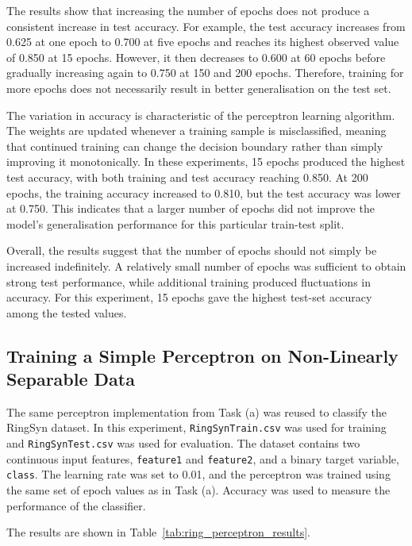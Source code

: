 \documentclass[a4paper,12pt]{article}
\begin{document}
The results show that increasing the number of epochs does not produce a consistent increase in test accuracy. For example, the test accuracy increases from 0.625 at one epoch to 0.700 at five epochs and reaches its highest observed value of 0.850 at 15 epochs. However, it then decreases to 0.600 at 60 epochs before gradually increasing again to 0.750 at 150 and 200 epochs. Therefore, training for more epochs does not necessarily result in better generalisation on the test set.

The variation in accuracy is characteristic of the perceptron learning algorithm. The weights are updated whenever a training sample is misclassified, meaning that continued training can change the decision boundary rather than simply improving it monotonically. In these experiments, 15 epochs produced the highest test accuracy, with both training and test accuracy reaching 0.850. At 200 epochs, the training accuracy increased to 0.810, but the test accuracy was lower at 0.750. This indicates that a larger number of epochs did not improve the model's generalisation performance for this particular train-test split.

Overall, the results suggest that the number of epochs should not simply be increased indefinitely. A relatively small number of epochs was sufficient to obtain strong test performance, while additional training produced fluctuations in accuracy. For this experiment, 15 epochs gave the highest test-set accuracy among the tested values.

\subsection{Training a Simple Perceptron on Non-Linearly Separable Data}

The same perceptron implementation from Task (a) was reused to classify the RingSyn dataset. In this experiment, \texttt{RingSynTrain.csv} was used for training and \texttt{RingSynTest.csv} was used for evaluation. The dataset contains two continuous input features, \texttt{feature1} and \texttt{feature2}, and a binary target variable, \texttt{class}. The learning rate was set to 0.01, and the perceptron was trained using the same set of epoch values as in Task (a). Accuracy was used to measure the performance of the classifier.

The results are shown in Table~\ref{tab:ring_perceptron_results}.
\end{document}
